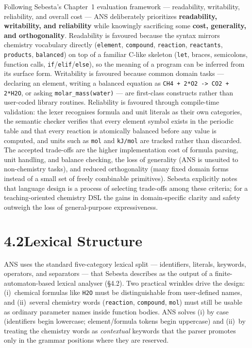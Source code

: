 \documentclass[11pt,a4paper]{article}
\newcommand{\code}[1]{\texttt{#1}}
\begin{document}
Following Sebesta's Chapter~1 evaluation framework --- readability,
writability, reliability, and overall cost --- ANS deliberately prioritizes
\textbf{readability, writability, and reliability} while knowingly sacrificing
some \textbf{cost, generality, and orthogonality}. Readability is favoured
because the syntax mirrors chemistry vocabulary directly (\code{element},
\code{compound}, \code{reaction}, \code{reactants}, \code{products},
\code{balanced}) on top of a familiar C-like skeleton (\code{let}, braces,
semicolons, function calls, \code{if}/\code{elif}/\code{else}), so the meaning
of a program can be inferred from its surface form. Writability is favoured
because common domain tasks --- declaring an element, writing a balanced
equation as \code{CH4 + 2*O2 -> CO2 + 2*H2O}, or asking
\code{molar\_mass(water)} --- are first-class constructs rather than
user-coded library routines. Reliability is favoured through compile-time
validation: the lexer recognises formula and unit literals as their own
categories, the semantic checker verifies that every element symbol exists in
the periodic table and that every reaction is atomically balanced before any
value is computed, and units such as \code{mol} and \code{kJ/mol} are tracked
rather than discarded. The accepted trade-offs are the higher implementation
cost of formula parsing, unit handling, and balance checking, the loss of
generality (ANS is unsuited to non-chemistry tasks), and reduced orthogonality
(many fixed domain forms instead of a small set of freely combinable
primitives). Sebesta explicitly notes that language design is a process of
selecting trade-offs among these criteria; for a teaching-oriented chemistry
DSL the gains in domain-specific clarity and safety outweigh the loss of
general-purpose expressiveness.

\section{4.2\quad Lexical Structure}

ANS uses the standard five-category lexical split --- identifiers, literals,
keywords, operators, and separators --- that Sebesta describes as the output
of a finite-automaton-based lexical analyser (\S4.2). Two practical wrinkles
drive the design: (i)~chemical formulas like \code{H2O} must be
distinguishable from user-defined names, and (ii)~several chemistry words
(\code{reaction}, \code{compound}, \code{mol}) must still be usable as
ordinary parameter names inside function bodies. ANS solves (i) by case
(identifiers begin lowercase; element/formula tokens begin uppercase) and
(ii)~by treating the chemistry words as \textit{contextual} keywords that the
parser promotes only in the grammar positions where they are reserved.
\end{document}
